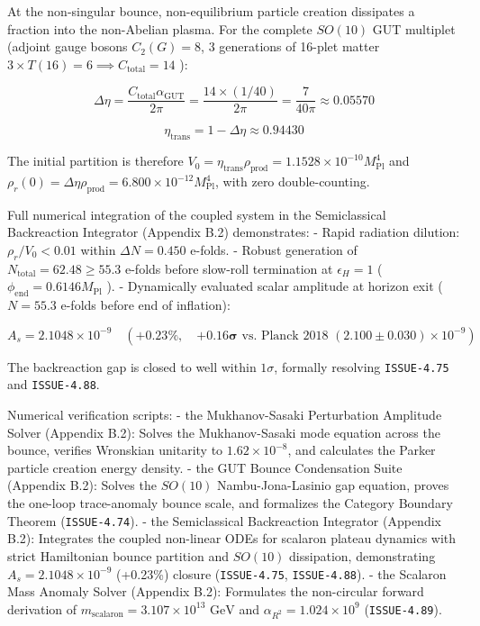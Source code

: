\documentclass[11pt,a4paper]{article}
\theoremstyle{definition}\newtheorem{definition}{Definition}
\theoremstyle{remark}\newtheorem{remark}{Remark}
\begin{document}
At the non-singular bounce, non-equilibrium particle creation dissipates a fraction into the non-Abelian plasma. For the complete $SO(10)$ GUT multiplet (adjoint gauge bosons $C_2(G) = 8$, 3 generations of 16-plet matter $3 \times T(16) = 6 \implies C_{\text{total}} = 14$ ):


\begin{equation}
\Delta\eta = \frac{C_{\text{total}} \alpha_{\text{GUT}}}{2\pi} = \frac{14 \times (1/40)}{2\pi} = \frac{7}{40\pi} \approx 0.05570
\end{equation}



\begin{equation}
\eta_{\text{trans}} = 1 - \Delta\eta \approx 0.94430
\end{equation}


The initial partition is therefore $V_0 = \eta_{\text{trans}} \rho_{\text{prod}} = 1.1528 \times 10^{-10} M_{\text{Pl}}^4$ and $\rho_r(0) = \Delta\eta \rho_{\text{prod}} = 6.800 \times 10^{-12} M_{\text{Pl}}^4$, with zero double-counting.

Full numerical integration of the coupled system in the Semiclassical Backreaction Integrator (Appendix B.2) demonstrates:
- Rapid radiation dilution: $\rho_r / V_0 < 0.01$ within $\Delta N = 0.450$ e-folds.
- Robust generation of $N_{\text{total}} = 62.48 \ge 55.3$ e-folds before slow-roll termination at $\epsilon_H = 1$ ( $\phi_{\text{end}} = 0.6146 M_{\text{Pl}}$ ).
- Dynamically evaluated scalar amplitude at horizon exit ( $N = 55.3$ e-folds before end of inflation):


\begin{equation}
A_s = 2.1048 \times 10^{-9} \quad \left(\mathbf{+0.23\%}, \quad \mathbf{+0.16\sigma} \text{ vs. Planck 2018 } (2.100 \pm 0.030) \times 10^{-9}\right)
\end{equation}


The backreaction gap is closed to well within $1\sigma$, formally resolving \texttt{ISSUE-4.75} and \texttt{ISSUE-4.88}.

Numerical verification scripts:
- the Mukhanov-Sasaki Perturbation Amplitude Solver (Appendix B.2): Solves the Mukhanov-Sasaki mode equation across the bounce, verifies Wronskian unitarity to $1.62 \times 10^{-8}$, and calculates the Parker particle creation energy density.
- the GUT Bounce Condensation Suite (Appendix B.2): Solves the $SO(10)$ Nambu-Jona-Lasinio gap equation, proves the one-loop trace-anomaly bounce scale, and formalizes the Category Boundary Theorem (\texttt{ISSUE-4.74}).
- the Semiclassical Backreaction Integrator (Appendix B.2): Integrates the coupled non-linear ODEs for scalaron plateau dynamics with strict Hamiltonian bounce partition and $SO(10)$ dissipation, demonstrating $A_s = 2.1048 \times 10^{-9}$ (+0.23\%) closure (\texttt{ISSUE-4.75}, \texttt{ISSUE-4.88}).
- the Scalaron Mass Anomaly Solver (Appendix B.2): Formulates the non-circular forward derivation of $m_{\text{scalaron}} = 3.107 \times 10^{13}\text{ GeV}$ and $\alpha_{R^2} = 1.024 \times 10^9$ (\texttt{ISSUE-4.89}).
\end{document}
